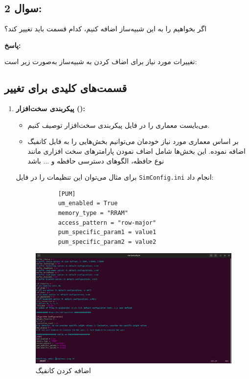\documentclass[12pt]{exam}
\begin{document}
\begin{questions}
	
	
	
	
	
	
	
	
	
	
	
	
	\subsection*{سوال 2:}
	
	اگر بخواهیم  را به این شبیه‌ساز اضافه کنیم، کدام قسمت باید تغییر کند؟
	
	
\textbf{پاسخ:‌ }

تغییرات مورد نیاز برای اضاف کردن  به شبیه‌ساز  به‌صورت زیر است:

\subsection*{قسمت‌های کلیدی برای تغییر}

\begin{enumerate}
	\item \textbf{پیکربندی سخت‌افزار ():}
	\begin{itemize}
		\item می‌بایست معماری  را در فایل پیکربندی سخت‌افزار توصیف کنیم.
		
		\item بر اساس معماری مورد نیاز خودمان می‌توانیم بخش‌هایی را به فایل کانفیگ اضافه نموده. این بخش‌ها شامل اضاف نمودن پارامتر‌های سخت افزاری  مانند نوع حافظه، الگو‌های دسترسی حافظه و ... باشد
	\end{itemize}
	
	
	
	
برای مثال می‌توان این تنظیمات را در فایل \texttt{SimConfig.ini} انجام داد:
	\begin{latin}
		\begin{verbatim}
			[PUM]
			um_enabled = True
			memory_type = "RRAM"
			access_pattern = "row-major"
			pum_specific_param1 = value1
			pum_specific_param2 = value2
		\end{verbatim} 
	\end{latin}
	
	
	\begin{figure}[h]
		\centering
		\includegraphics[width=1\textwidth]{images/6-Add_PUM_to_SimConfig.png}
		\caption{اضافه کردن کانفیگ }
		\label{اضافه کردن کانفیگ PUM}
	\end{figure}
	

\end{enumerate}
\end{questions}
\end{document}
